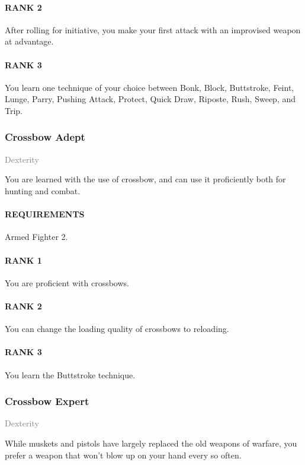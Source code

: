 \paragraph{RANK 2} After rolling for initiative, you make your first attack with an improvised weapon at advantage.
\paragraph{RANK 3} You learn one technique of your choice between Bonk, Block, Buttstroke, Feint, Lunge, Parry, Pushing Attack, Protect, Quick Draw, Riposte, Rush, Sweep, and Trip.

\subsubsection{Crossbow Adept} \label{feat::crossbowadept}
\small{\textcolor{gray}{Dexterity}}

\normalsize
You are learned with the use of crossbow, and can use it proficiently both for hunting and combat.
\paragraph{REQUIREMENTS} Armed Fighter 2.
\paragraph{RANK 1} You are proficient with crossbows.
\paragraph{RANK 2} You can change the loading quality of crossbows to reloading.
\paragraph{RANK 3} You learn the Buttstroke technique.

\subsubsection{Crossbow Expert} \label{feat::crossbowexpert}
\small{\textcolor{gray}{Dexterity}}

\normalsize
While muskets and pistols have largely replaced the old weapons of warfare, you prefer a weapon that won't blow up on your hand every so often.
